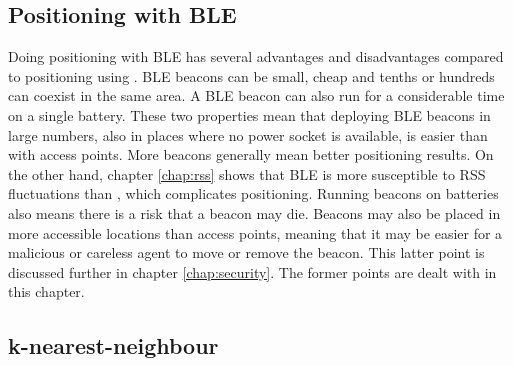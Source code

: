\subsection{Positioning with BLE}
Doing positioning with BLE has several advantages and disadvantages compared to positioning using \wifi.
BLE beacons can be small, cheap and tenths or hundreds can coexist in the same area.
A BLE beacon can also run for a considerable time on a single battery.
These two properties mean that deploying BLE beacons in large numbers, also in places where no power socket is available, is easier than with \wifi access points.
More beacons generally mean better positioning results.
On the other hand, chapter \ref{chap:rss} shows that BLE is more susceptible to RSS fluctuations than \wifi, which complicates positioning.
Running beacons on batteries also means there is a risk that a beacon may die.
Beacons may also be placed in more accessible locations than \wifi access points, meaning that it may be easier for a malicious or careless agent to move or remove the beacon.
This latter point is discussed further in chapter \ref{chap:security}.
The former points are dealt with in this chapter.


\subsection{k-nearest-neighbour}
\begin{comment}
The one-shot positioning algorithm is a function that maps from a measurement $M$, using a survey database $S$ to a probability distribution over positions $P$.

\begin{equation}
M \xrightarrow{S} P
\end{equation}

Finding the position for a measurement is often done through the k-nearest-neighbour method\citet{bahl2000radar}.
The method works in two steps: first the measured RSS is compared with the surveyed RSS for each point $s$ in the database (or a subset thereof of all plausible points), and a ``distance'' $d_{M,s}$ is calculated for each point, describing how far the measured RSS lies from the RSS surveyed at that point; second, using the distances to each point, $P$ is calculated.

The first step is usually done by taking the Manhattan-distance
\begin{equation}
    d_{M, s)} = \sum_{b \epsilon B}|M_b-s_b|
    \label{eq:manhattan}
\end{equation}
or the Euclidean-distance
\begin{equation}
    d_{M, s)} = \sum_{b \epsilon B}(M_b-s_b)^2
    \label{eq:euclidean}
\end{equation}
on the dB values, although in many cases it is not clear what is being used.
Most research has focussed on the second step, using the sorted list of distances to find $P$.
\begin{equation}
    D=\{d_0,p_0\},\{d_1,p_1\},\ldots  \quad \quad d_i \leq d_{i+1}
\end{equation}

\end{comment}

